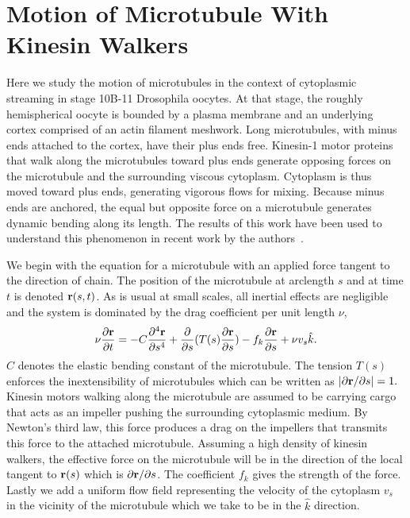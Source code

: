 \documentclass[pre,showpacs]{revtex4}
\def\br{{\bf r}}
\begin{document}
\section{Motion of Microtubule With Kinesin Walkers}

Here we study the motion of microtubules in the context of cytoplasmic
streaming in stage 10B-11 Drosophila oocytes.  At that stage, the roughly
hemispherical oocyte is bounded by a plasma membrane and an underlying
cortex comprised of an actin filament meshwork.  Long microtubules,
with minus ends attached to the cortex, have their plus ends free.
Kinesin-1 motor proteins that walk along the microtubules toward plus
ends generate opposing forces on the microtubule and the surrounding
viscous cytoplasm.  Cytoplasm is thus moved toward plus ends, generating
vigorous flows for mixing.  Because minus ends are anchored, the equal
but opposite force on a microtubule generates dynamic bending along
its length.  The results of this work have been used to understand this
phenomenon in recent work by the authors~\cite{DeutschBrunnerSaxton}.

We begin with the equation for a microtubule with an applied force tangent to the direction of chain. The position
of the microtubule at arclength $s$ and at time $t$ is denoted $\br(s,t)$. As is usual at small scales, all inertial effects are negligible
and the system is dominated by the drag coefficient per unit length $\nu$,
\begin{equation}
\label{eq:microtubule}
\nu \frac{\partial \br}{\partial t} =  -C \frac{\partial^4 \br}{\partial s^4} + \frac{\partial}{\partial s}(T(s)\frac{\partial \br}{\partial s}) -
f_k \frac{\partial \br}{\partial s} + \nu v_{s}{\hat k} .
\end{equation}
$C$ denotes the elastic bending constant of the microtubule. The tension $T(s)$ enforces the inextensibility of microtubules which
can be written as  $|\partial \br/\partial s| = 1.$ 
Kinesin motors walking along the microtubule are assumed to be carrying cargo that acts as an impeller pushing the surrounding
cytoplasmic medium. By Newton's third law, this force produces a drag on the impellers that transmits this force to the
attached microtubule. Assuming a high density of kinesin walkers, the effective force on the microtubule will be in the
direction of the local tangent to $\br(s)$ which is $\partial \br/\partial s$. The coefficient $f_k$ gives the strength of the force.
Lastly we add a uniform flow field representing the velocity of the cytoplasm $v_s$ in the vicinity of the microtubule
which we take to be in the $\hat k$ direction.
\end{document}
